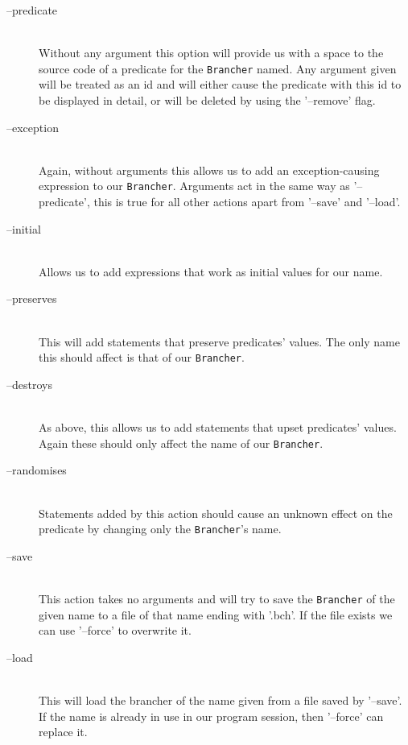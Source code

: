 \documentclass[twoside,a4paper]{report}
\begin{document}
\begin{description}
\item[--predicate] \hfill \\
Without any argument this option will provide us with a space to the source code of a predicate for the \texttt{Brancher} named. Any argument given will be
treated as an id and will either cause the predicate with this id to be displayed in detail, or will be deleted by using the '--remove' flag.

\item[--exception] \hfill \\
Again, without arguments this allows us to add an exception-causing expression to our \texttt{Brancher}. Arguments act in the same way as '--predicate', this is
true for all other actions apart from '--save' and '--load'.

\item[--initial] \hfill \\
Allows us to add expressions that work as initial values for our name.

\item[--preserves] \hfill \\
This will add statements that preserve predicates' values. The only name this should affect is that of our \texttt{Brancher}.

\item[--destroys] \hfill \\
As above, this allows us to add statements that upset predicates' values. Again these should only affect the name of our \texttt{Brancher}.

\item[--randomises] \hfill \\
Statements added by this action should cause an unknown effect on the predicate by changing only the \texttt{Brancher}'s name.

\item[--save] \hfill \\
This action takes no arguments and will try to save the \texttt{Brancher} of the given name to a file of that name ending with '.bch'.
If the file exists we can use '--force' to overwrite it.

\item[--load] \hfill \\
This will load the brancher of the name given from a file saved by '--save'. If the name is already in use in our program session, then '--force'
can replace it.
\end{description}
\end{document}

